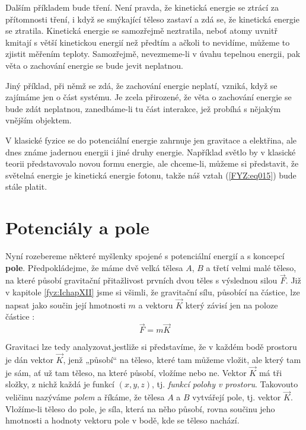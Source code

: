     Dalším příkladem bude tření. Není pravda, že kinetická energie se ztrácí za přítomnosti tření, 
    i když se smýkající těleso zastaví a zdá se, že kinetická energie se ztratila. Kinetická 
    energie se samozřejmě neztratila, neboť atomy uvnitř kmitají s větší kinetickou energií než 
    předtím a ačkoli to nevidíme, můžeme to zjistit měřením teploty. Samozřejmě, nevezmeme-li v 
    úvahu tepelnou energii, pak věta o zachování energie se bude jevit neplatnou.
    
    Jiný příklad, při němž se zdá, že zachování energie neplatí, vzniká, když se zajímáme jen o 
    část systému. Je zcela přirozené, že věta o zachování energie se bude zdát neplatnou, 
    zanedbáme-li tu část interakce, jež probíhá s nějakým vnějším objektem.
    
    V klasické fyzice se do potenciální energie zahrnuje jen gravitace a elektřina, ale dnes známe 
    jadernou energii i jiné druhy energie. Například světlo by v klasické teorii představovalo 
    novou formu energie, ale chceme-li, můžeme si představit, že světelná energie je kinetická 
    energie fotonu, takže náš vztah (\ref{FYZ:eq015}) bude stále platit.
    
  \section{Potenciály a pole}
    Nyní rozebereme některé myšlenky spojené s potenciální energií a s koncepcí \textbf{pole}. 
    Předpokládejme, že máme dvě velká tělesa \(A\), \(B\) a třetí velmi malé těleso, na které 
    působí gravitační přitažlivost prvních dvou těles s výslednou silou \(\vec{F}\). Již v kapitole 
    \ref{fyz:IchapXII} jsme si všimli, že gravitační sílu, působící na částice, lze napsat 
    jako součin její hmotnosti \(m\) a vektoru \(\vec{K}\) který závisí jen na poloze 
    částice \cite[s.~204]{Feynman01}:
    \begin{equation}\label{FYZ:eq001}
      \vec{F} = m \vec{K}
    \end{equation}
    
    Gravitaci lze tedy analyzovat,jestliže si představíme, že v každém bodě prostoru je dán vektor 
    \(\vec{K}\), jenž „působí“ na těleso, které tam můžeme vložit, ale který tam je sám, ať už tam 
    těleso, na které působí, vložíme nebo ne. Vektor \(\vec{K}\) má tři složky, z nichž každá je 
    funkcí \((x, y, z)\), tj. \emph{funkcí polohy v prostoru}. Takovouto veličinu nazýváme 
    \emph{polem} a říkáme, že tělesa \(A\) a \(B\) vytvářejí pole, tj.  vektor 
    \(\vec{K}\). Vložíme-li těleso do pole, je síla, která na něho působí, rovna součinu jeho 
    hmotnosti a hodnoty vektoru pole v bodě, kde se těleso nachází.
    
